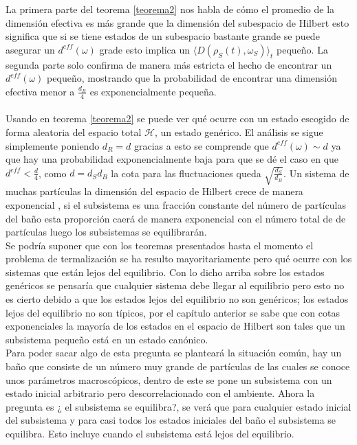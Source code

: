 La primera parte del teorema \ref{teorema2} nos habla de cómo el promedio de la dimensión efectiva es más grande que la dimensión del subespacio de Hilbert esto significa que si se tiene estados de un subespacio bastante grande se puede asegurar un $d^{eff}(\omega)$ grade esto implica un $\langle D(\rho_{S}(t) ,\omega_{S}) \rangle_{t}$ pequeño. La segunda parte solo confirma de manera más estricta el hecho de encontrar un $d^{eff}(\omega)$ pequeño, mostrando que la probabilidad de encontrar una dimensión efectiva menor a $\frac{d_{R}}{4}$ es exponencialmente pequeña.\\
\\
Usando en teorema \ref{teorema2} se puede ver qué ocurre con un estado escogido de forma aleatoria del espacio total $\mathcal{H}$, un estado genérico. El análisis se sigue simplemente poniendo $d_{R}=d$ gracias a esto se comprende que $d^{eff}(\omega) \sim d$ ya que  hay una probabilidad exponencialmente baja para que se dé  el caso en que $d^{eff} < \frac{d}{4}$, como $d=d_{S}d_{B}$ la cota para las fluctuaciones queda $\sqrt{\frac{d_{S}}{d_{B}}}$. Un sistema de muchas partículas la dimensión del espacio de Hilbert crece de manera exponencial \cite{TodaStat}, si el subsistema es una fracción constante del número de partículas del baño esta proporción caerá de manera exponencial con el número total de de partículas luego los subsistemas se equilibrarán.
\\
Se podría suponer que  con los teoremas presentados hasta el momento el problema de termalización se ha resulto mayoritariamente pero qué ocurre con los sistemas que están lejos del equilibrio. Con lo dicho arriba sobre los estados genéricos se pensaría que cualquier sistema debe llegar al equilibrio pero esto no es cierto debido a que los estados lejos del equilibrio no son genéricos; los estados lejos del equilibrio no son típicos, por el capítulo anterior se sabe que con cotas exponenciales la mayoría de los estados en el espacio de Hilbert son tales que un subsistema pequeño está en un estado canónico.
\\
Para poder sacar algo de esta pregunta se planteará la situación común, hay un baño que consiste de un número muy grande de partículas de las cuales se conoce unos parámetros macroscópicos, dentro de este se pone un subsistema con un estado inicial arbitrario pero descorrelacionado con el ambiente. Ahora la pregunta es ¿ el subsistema se equilibra?, se verá que para cualquier estado inicial del subsistema y para casi todos los estados iniciales del baño el subsistema se equilibra. Esto incluye cuando el subsistema está lejos del equilibrio.
